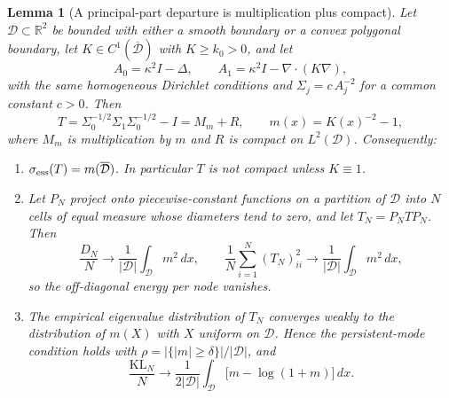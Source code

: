 \documentclass[11pt]{article}
\newtheorem{lemma}[proposition]{Lemma}
\numberwithin{table}{section}
\numberwithin{figure}{section}
\begin{document}
\begin{lemma}[A principal-part departure is multiplication plus compact]
\label{lem:mult_compact}
Let $\mathcal D\subset\mathbb R^2$ be bounded with either a smooth boundary or a convex polygonal boundary, let $K\in C^1(\overline{\mathcal D})$ with $K\ge k_0>0$, and let
\begin{equation}
    A_0=\kappa^2I-\Delta,
    \qquad
    A_1=\kappa^2I-\nabla\!\cdot(K\nabla),
\end{equation}
with the same homogeneous Dirichlet conditions and $\Sigma_j=c\,A_j^{-2}$ for a common constant $c>0$. Then
\begin{equation}
    T=\Sigma_0^{-1/2}\Sigma_1\Sigma_0^{-1/2}-I=M_m+R,
    \qquad
    m(x)=K(x)^{-2}-1,
    \label{eq:mult_compact}
\end{equation}
where $M_m$ is multiplication by $m$ and $R$ is compact on $L^2(\mathcal D)$. Consequently:
\begin{enumerate}
    \item[(i)] $\sigma_{\rm ess}(T)=m(\overline{\mathcal D})$. In particular $T$ is not compact unless $K\equiv1$.
    \item[(ii)] Let $P_N$ project onto piecewise-constant functions on a partition of $\mathcal D$ into $N$ cells of equal measure whose diameters tend to zero, and let $T_N=P_NTP_N$. Then
    \begin{equation}
        \frac{D_N}{N}\longrightarrow\frac{1}{|\mathcal D|}\int_{\mathcal D}m^2\,dx,
        \qquad
        \frac1N\sum_{i=1}^{N}(T_N)_{ii}^2\longrightarrow\frac{1}{|\mathcal D|}\int_{\mathcal D}m^2\,dx,
        \label{eq:lemma_energy}
    \end{equation}
    so the off-diagonal energy per node vanishes.
    \item[(iii)] The empirical eigenvalue distribution of $T_N$ converges weakly to the distribution of $m(X)$ with $X$ uniform on $\mathcal D$. Hence the persistent-mode condition holds with $\rho=|\{|m|\ge\delta\}|/|\mathcal D|$, and
    \begin{equation}
        \frac{\mathrm{KL}_N}{N}\longrightarrow\frac{1}{2|\mathcal D|}\int_{\mathcal D}\big[m-\log(1+m)\big]\,dx.
        \label{eq:lemma_kl}
    \end{equation}
\end{enumerate}
\end{lemma}
\end{document}
